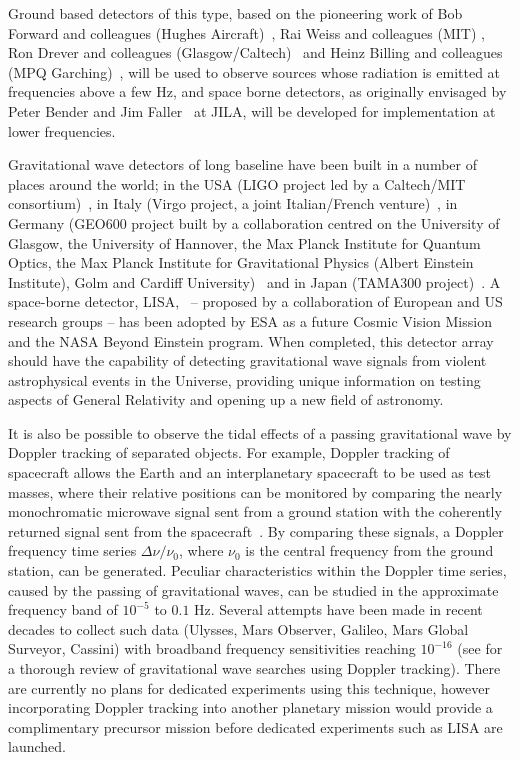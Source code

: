\documentclass{article}
\begin{document}
Ground based detectors of this type, based on the pioneering work of Bob Forward
and colleagues (Hughes Aircraft)~\cite{Forward}, Rai Weiss and colleagues (MIT)
\cite{Weiss}, Ron Drever and colleagues (Glasgow/Caltech)~\cite{Drever1,
Drever2} and Heinz Billing and colleagues (MPQ Garching)~\cite{Billing}, will be
used to observe sources whose radiation is emitted at frequencies above a few
Hz, and space borne detectors, as originally envisaged by Peter Bender and Jim
Faller~\cite{BenderFaller1, BenderFaller2} at JILA, will be developed for
implementation at lower frequencies.

Gravitational wave detectors of long baseline have been built in a number of
places around the world; in the USA (LIGO project led by a Caltech/MIT
consortium)~\cite{LIGOS5, LIGOweb}, in Italy (Virgo project, a joint
Italian/French venture)~\cite{Acernese:2007, VIRGOweb}, in Germany (GEO600
project built by a collaboration centred on the University of Glasgow, the
University of Hannover, the Max Planck Institute for Quantum Optics, the Max
Planck Institute for Gravitational Physics (Albert Einstein Institute), Golm and
Cardiff University)~\cite{Willke:2007, GEOweb} and in Japan (TAMA300
project)~\cite{TAMAStatus, TAMAweb}. A space-borne detector, LISA,~\cite{LISA,
NASAweb, ESAweb} -- proposed by a collaboration of European and US research
groups -- has been adopted by ESA as a future Cosmic Vision Mission and the NASA
Beyond Einstein program. When completed, this detector array should have the
capability of detecting gravitational wave signals from violent astrophysical
events in the Universe, providing unique information on testing aspects of
General Relativity and opening up a new field of astronomy.

It is also be possible to observe the tidal effects of a passing gravitational
wave by Doppler tracking of separated objects.  For example, Doppler tracking of
spacecraft allows the Earth and an interplanetary spacecraft to be used as test
masses, where their relative positions can be monitored by comparing the nearly
monochromatic microwave signal sent from a ground station with the coherently
returned signal sent from the spacecraft~\cite{Estabrook:1975}.  By comparing
these signals, a Doppler frequency time series $\Delta \nu / \nu_0$, where
$\nu_0$ is the central frequency from the ground station, can be generated.
Peculiar characteristics within the Doppler time series, caused by the passing
of gravitational waves, can be studied in the approximate frequency band of
$10^{-5}$ to $0.1$ Hz. Several attempts have been made in recent decades to
collect such data (Ulysses, Mars Observer, Galileo, Mars Global Surveyor,
Cassini) with broadband frequency sensitivities reaching $10^{-16}$ (see
\cite{Armstrong:2006} for a thorough review of gravitational wave searches using
Doppler tracking). There are currently no plans for dedicated experiments using
this technique, however incorporating Doppler tracking into another planetary
mission would provide a complimentary precursor mission before dedicated
experiments such as LISA are launched.
\end{document}
